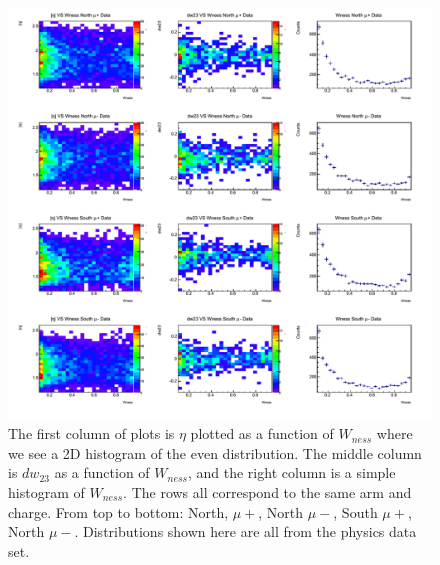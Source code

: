 \begin{figure}
  \centering
  \includegraphics[width=\linewidth]{./figures/dw23_vs_wness_data.png}
  \caption{
    The first column of plots is $\eta$ plotted as a function of $W_{ness}$
    where we see a 2D histogram of the even distribution. The middle column is
    $dw_{23}$ as a function of $W_{ness}$, and the right column is a simple
    histogram of $W_{ness}$. The rows all correspond to the same arm and charge.
    From top to bottom: North, $\mu+$, North $\mu-$, South $\mu+$, North $\mu-$.
    Distributions shown here are all from the physics data set.
  }
  \label{fig:dw23_eta_wness_dat}
\end{figure}

